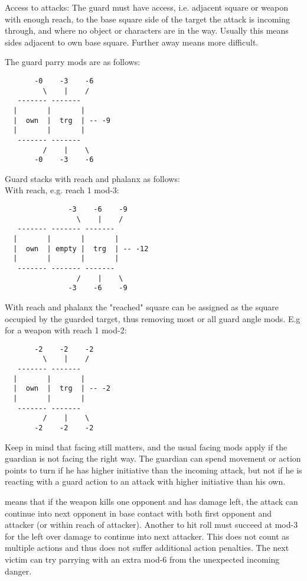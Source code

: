 Access to attacks: The guard must have access, i.e. adjacent square or weapon with enough reach, to the base square side of the target the attack is incoming through, and where no object or characters are in the way. Usually this means sides adjacent to own base square. Further away means more difficult.

The guard parry mods are as follows:
\begin{samepage} \small \begin{verbatim}
       -0    -3    -6
         \    |    /
   ------- -------
  |       |       |
  |  own  |  trg  | -- -9
  |       |       |
   ------- -------
         /    |    \
       -0    -3    -6
\end{verbatim} \normalsize \end{samepage}

Guard stacks with reach and phalanx as follows:\\
With reach, e.g. reach 1 mod-3:
\begin{samepage} \small \begin{verbatim}
               -3    -6    -9
                 \    |    /
   ------- ------- -------
  |       |       |       |
  |  own  | empty |  trg  | -- -12
  |       |       |       |
   ------- ------- -------
                 /    |    \
               -3    -6    -9
\end{verbatim} \normalsize \end{samepage}

With reach and phalanx the "reached" square can be assigned as the square occupied by the guarded target, thus removing most or all guard angle mods. E.g for a weapon with reach 1 mod-2:
\begin{samepage} \small \begin{verbatim}
       -2    -2    -2
         \    |    /
   ------- -------
  |       |       |
  |  own  |  trg  | -- -2
  |       |       |
   ------- -------
         /    |    \
       -2    -2    -2
\end{verbatim} \normalsize \end{samepage}

Keep in mind that facing still matters, and the usual facing mods apply if the guardian is not facing the right way. The guardian can spend movement or action points to turn if he has higher initiative than the incoming attack, but not if he is reacting with a guard action to an attack with higher initiative than his own.


\skill{Maneuver (cost 10) "sweep":} means that if the weapon kills one opponent and has damage left, the attack can continue into next opponent in base contact with both first opponent and attacker (or within reach of attacker). Another to hit roll must succeed at mod-3 for the left over damage to continue into next attacker. This does not count as multiple actions and thus does not suffer additional action penalties. The next victim can try parrying with an extra mod-6 from the unexpected incoming danger.

